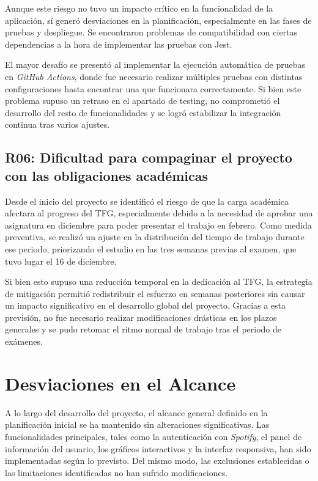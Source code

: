 Aunque este riesgo no tuvo un impacto crítico en la funcionalidad de la aplicación, sí generó desviaciones en la planificación, especialmente en las fases de pruebas y despliegue. Se encontraron problemas de compatibilidad con ciertas dependencias a la hora de implementar las pruebas con Jest.

El mayor desafío se presentó al implementar la ejecución automática de pruebas en \textit{GitHub Actions}, donde fue necesario realizar múltiples pruebas con distintas configuraciones hasta encontrar una que funcionara correctamente. Si bien este problema supuso un retraso en el apartado de testing, no comprometió el desarrollo del resto de funcionalidades y se logró estabilizar la integración continua tras varios ajustes.

\subsection*{R06: Dificultad para compaginar el proyecto con las obligaciones académicas}

Desde el inicio del proyecto se identificó el riesgo de que la carga académica afectara al progreso del TFG, especialmente debido a la necesidad de aprobar una asignatura en diciembre para poder presentar el trabajo en febrero. Como medida preventiva, se realizó un ajuste en la distribución del tiempo de trabajo durante ese periodo, priorizando el estudio en las tres semanas previas al examen, que tuvo lugar el 16 de diciembre.

Si bien esto supuso una reducción temporal en la dedicación al TFG, la estrategia de mitigación permitió redistribuir el esfuerzo en semanas posteriores sin causar un impacto significativo en el desarrollo global del proyecto. Gracias a esta previsión, no fue necesario realizar modificaciones drásticas en los plazos generales y se pudo retomar el ritmo normal de trabajo tras el periodo de exámenes.

\section{Desviaciones en el Alcance}

A lo largo del desarrollo del proyecto, el alcance general definido en la planificación inicial se ha mantenido sin alteraciones significativas. Las funcionalidades principales, tales como la autenticación con \textit{Spotify}, el panel de información del usuario, los gráficos interactivos y la interfaz responsiva, han sido implementadas según lo previsto. Del mismo modo, las exclusiones establecidas o las limitaciones identificadas no han sufrido modificaciones.

